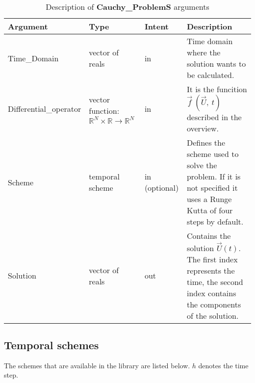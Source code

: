 \begin{table}[H]
	\begin{center}
		\begin{spacing}{1.2}
			\begin{tabular}{| l | p{2.5cm}| l | p{6cm} |}
				
				\hline
				
				\bf Argument & \bf Type & \bf Intent & \bf Description \\ \hline \hline
				
				Time\_Domain & vector of reals & in &  Time domain where the solution wants to be calculated.  \\ \hline
				
				Differential\_operator &  vector function: $\mathbb{R}^{N} \times\mathbb{R} \rightarrow \mathbb{R}^{N}$  & in & It is the funcition $\vec{f}\ (\vec{U},\ t) $ described in the overview.  \\ \hline
				
				Scheme & temporal scheme  & in (optional) & Defines the scheme used to solve the problem. If it is not specified it uses a Runge Kutta of four steps by default.    \\ \hline
				
				Solution & vector of reals  & out &  Contains the solution $\vec{U}(t)$. The first index represents the time, the second index contains the components of the solution.  \\ \hline
				
				
			\end{tabular}
		\end{spacing}
	\end{center}
	\caption{Description of \textbf{Cauchy\_ProblemS} arguments}
\end{table}

\newpage

\subsection{Temporal schemes}

The schemes that are available in the library are listed below. $h$ denotes the time step.

